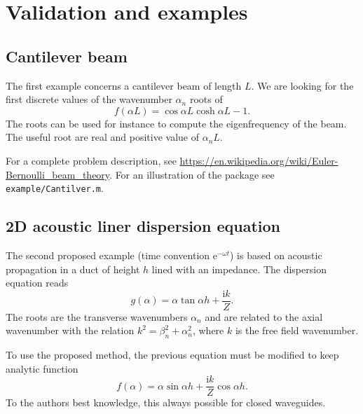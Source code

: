 \documentclass[a4paper,10pt]{article}
\renewcommand{\i}{\mathrm{i}}
\begin{document}
\section{Validation and examples}


\subsection{Cantilever beam}
The first example concerns a cantilever beam of length $L$. We are looking for the first discrete values of the wavenumber $\alpha_n$ roots of 
\begin{equation}
f(\alpha L) = \cos \alpha L \cosh \alpha L -1.
\end{equation}
The roots can be used for instance to compute the eigenfrequency of the beam. The useful root are real and positive value of $\alpha_n L$.

For a complete problem description, see \url{https://en.wikipedia.org/wiki/Euler-Bernoulli_beam_theory}. For an illustration of the package see \texttt{example/Cantilver.m}.

\subsection{2D acoustic liner dispersion equation}
The second proposed example (time convention $\mathrm{e}^{-\omega t}$) is based on acoustic propagation in a duct of height $h$ lined with an impedance. The dispersion equation reads
\begin{equation}
	g(\alpha) = \alpha \tan \alpha h + \frac{\i k}{Z}.
\end{equation}
The roots are the transverse wavenumbers $\alpha_n$ and are related to the axial wavenumber with the relation $k^2 = \beta_n^2 + \alpha_n^2$, where $k$ is the free field wavenumber.

To use the proposed method, the previous equation must be modified to keep analytic function 
\begin{equation}
	f(\alpha) = \alpha \sin \alpha h + \frac{\i k}{Z} \cos \alpha h.
\end{equation}
To the authors best knowledge, this always possible for closed waveguides.
\end{document}
